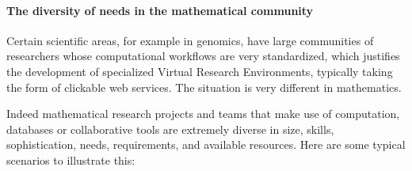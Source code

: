 


\paragraph{The diversity of needs in the mathematical community}

Certain scientific areas, for example in genomics, have large
communities of researchers whose computational workflows are very
standardized, which justifies the development of specialized Virtual
Research Environments, typically taking the form of clickable web
services. The situation is very different in mathematics.

Indeed mathematical research projects and teams that make use of
computation, databases or collaborative tools are extremely diverse in
size, skills, sophistication, needs, requirements, and available
resources. Here are some typical scenarios to illustrate this:

